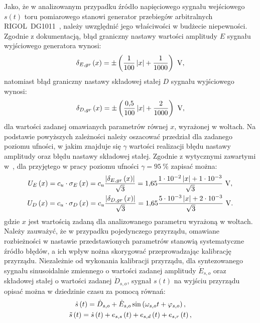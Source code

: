 Jako, że w analizowanym przypadku źródło napięciowego sygnału wejściowego $s(t)$ toru pomiarowego stanowi generator przebiegów arbitralnych RIGOL~DG1011~\cite{rigol_fawg}, należy uwzględnić jego właściwości w budżecie niepewności. Zgodnie z dokumentacją, błąd graniczny nastawy wartości amplitudy $E$ sygnału wyjściowego generatora wynosi:
\begin{equation}
\delta_{E,gr} \emb{x} = \pm \emb{\frac{1}{100} \left| x \right| + \frac{1}{1000}} ~\unit{V} \label{eq:pom_gen_amperr_max},
\end{equation}
natomiast błąd graniczny nastawy składowej stałej $D$ sygnału wyjściowego wynosi:
\begin{equation}
\delta_{D,gr} \emb{x} = \pm \emb{\frac{\num{0.5}}{100} \left| x \right| + \frac{2}{1000}} ~\unit{V} \label{eq:pom_gen_shferr_max},
\end{equation}
dla wartości zadanej omawianych parametrów równej $x$, wyrażonej w woltach. Na podstawie powyższych zależności należy oszacować przedział dla zadanego poziomu ufności, w jakim znajduje się $\gamma$ wartości realizacji błędu nastawy amplitudy oraz błędu nastawy składowej stałej. Zgodnie z wytycznymi zawartymi w~\cite{jcgm_guide}, dla przyjętego w pracy poziomu ufności $\gamma = \qty{95}{\percent}$ zapisać można:
\begin{gather}
U_{E} \emb{x} = c_{u} \cdot \sigma_{E} \emb{x} = c_{u} \frac{\left| \delta_{E,gr} \emb{x} \right|}{\sqrt{3}} = \num{1.65} \frac{\num{1e-2} \left| x \right| + \num{1e-3}}{\sqrt{3}} ~\unit{V} \label{eq:pom_gen_amperr_unc}, \\
U_{D} \emb{x} = c_{u} \cdot \sigma_{D} \emb{x} = c_{u} \frac{\left| \delta_{D,gr} \emb{x} \right|}{\sqrt{3}} = \num{1.65} \frac{\num{5e-3} \left| x \right| + \num{2e-3}}{\sqrt{3}} ~\unit{V} \label{eq:pom_gen_shferr_unc}.
\end{gather}
gdzie $x$ jest wartością zadaną dla analizowanego parametru wyrażoną w woltach. Należy zauważyć, że w przypadku pojedynczego przyrządu, omawiane rozbieżności w nastawie przedstawionych parametrów stanowią systematyczne źródło błędów, a ich wpływ nożna skorygować przeprowadzając kalibrację przyrządu. Niezależnie od wykonania kalibracji przyrządu, dla syntezowanego sygnału sinusoidalnie zmiennego o wartości zadanej amplitudy $\dot{E}_{s,o}$ oraz składowej stałej o wartości zadanej $\dot{D}_{s,o}$, sygnał $s(t)$ na wyjściu przyrządu opisać można w dziedzinie czasu za pomocą równań:
\begin{gather}
\dot{s} \left(t\right) = \dot{D}_{s,o} + \dot{E}_{s,o} \sin \left(\omega_{s,o} t + \varphi_{s,o}\right) \label{eq:pom_gen_out_ideal}, \\
\tilde{s} \left(t\right) = \dot{s} \left(t\right) + e_{s,s} \left(t\right) + e_{s,d} \left(t\right) + e_{s,r} \left(t\right) \label{eq:pom_gen_out_real},
\end{gather}
